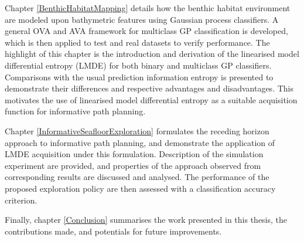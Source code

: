 		Chapter \ref{BenthicHabitatMapping} details how the benthic habitat environment are modeled upon bathymetric features using Gaussian process classifiers. A general OVA and AVA framework for multiclass GP classification is developed, which is then applied to test and real datasets to verify performance. The highlight of this chapter is the introduction and derivation of the linearised model differential entropy (LMDE) for both binary and multiclass GP classifiers. Comparisons with the usual prediction information entropy is presented to demonstrate their differences and respective advantages and disadvantages. This motivates the use of linearised model differential entropy as a suitable acquisition function for informative path planning.
		
		Chapter \ref{InformativeSeafloorExploration} formulates the receding horizon approach to informative path planning, and demonstrate the application of LMDE acquisition under this formulation. Description of the simulation experiment are provided, and properties of the approach observed from corresponding results are discussed and analysed. The performance of the proposed exploration policy are then assessed with a classification accuracy criterion.
		
		Finally, chapter \ref{Conclusion} summarises the work presented in this thesis, the contributions made, and potentials for future improvements.